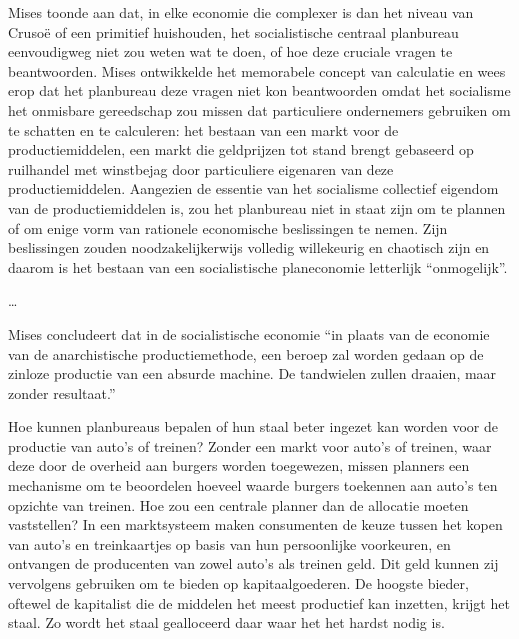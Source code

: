 \begin{blockquotebox}
    Mises toonde aan dat, in elke economie die complexer is dan het niveau van Crusoë of een primitief huishouden, het socialistische centraal planbureau eenvoudigweg niet zou weten wat te doen, of hoe deze cruciale vragen te beantwoorden. Mises ontwikkelde het memorabele concept van calculatie en wees erop dat het planbureau deze vragen niet kon beantwoorden omdat het socialisme het onmisbare gereedschap zou missen dat particuliere ondernemers gebruiken om te schatten en te calculeren: het bestaan van een markt voor de productiemiddelen, een markt die geldprijzen tot stand brengt gebaseerd op ruilhandel met winstbejag door particuliere eigenaren van deze productiemiddelen. Aangezien de essentie van het socialisme collectief eigendom van de productiemiddelen is, zou het planbureau niet in staat zijn om te plannen of om enige vorm van rationele economische beslissingen te nemen. Zijn beslissingen zouden noodzakelijkerwijs volledig willekeurig en chaotisch zijn en daarom is het bestaan van een socialistische planeconomie letterlijk ``onmogelijk''.
    \par\vspace{1em}\noindent
    \ldots
    \par\vspace{1em}\noindent
    Mises concludeert dat in de socialistische economie ``in plaats van de economie van de \textquotesingle anarchistische\textquotesingle{} productiemethode, een beroep zal worden gedaan op de zinloze productie van een absurde machine. De tandwielen zullen draaien, maar zonder resultaat.''\footnotemark
\end{blockquotebox}

Hoe kunnen planbureaus bepalen of hun staal beter ingezet kan worden voor de productie van auto's of treinen? Zonder een markt voor auto's of treinen, waar deze door de overheid aan burgers worden toegewezen, missen planners een mechanisme om te beoordelen hoeveel waarde burgers toekennen aan auto's ten opzichte van treinen. Hoe zou een centrale planner dan de allocatie moeten vaststellen? In een marktsysteem maken consumenten de keuze tussen het kopen van auto's en treinkaartjes op basis van hun persoonlijke voorkeuren, en ontvangen de producenten van zowel auto's als treinen geld. Dit geld kunnen zij vervolgens gebruiken om te bieden op kapitaalgoederen. De hoogste bieder, oftewel de kapitalist die de middelen het meest productief kan inzetten, krijgt het staal. Zo wordt het staal gealloceerd daar waar het het hardst nodig is.


